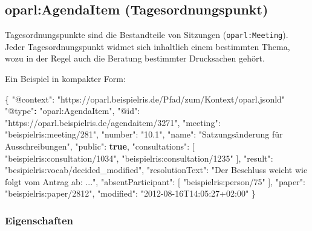 \documentclass[,a4paper]{article}
\newenvironment{Shaded}{}{}
\newcommand{\KeywordTok}[1]{\textcolor[rgb]{0.00,0.44,0.13}{\textbf{{#1}}}}
\newcommand{\DataTypeTok}[1]{\textcolor[rgb]{0.56,0.13,0.00}{{#1}}}
\newcommand{\StringTok}[1]{\textcolor[rgb]{0.25,0.44,0.63}{{#1}}}
\newcommand{\OtherTok}[1]{\textcolor[rgb]{0.00,0.44,0.13}{{#1}}}
\newcommand{\FunctionTok}[1]{\textcolor[rgb]{0.02,0.16,0.49}{{#1}}}
\newcommand{\ErrorTok}[1]{\textcolor[rgb]{1.00,0.00,0.00}{\textbf{{#1}}}}
\begin{document}
\subsection{oparl:AgendaItem
(Tagesordnungspunkt)}\label{oparlux5fagendaitem}

Tagesordnungspunkte sind die Bestandteile von Sitzungen
(\texttt{oparl:Meeting}). Jeder Tagesordnungspunkt widmet sich
inhaltlich einem bestimmten Thema, wozu in der Regel auch die Beratung
bestimmter Drucksachen gehört.

Ein Beispiel in kompakter Form:

\begin{Shaded}
\begin{Highlighting}[]
\FunctionTok{\{}
    \DataTypeTok{"@context"}\FunctionTok{:} \StringTok{"https://oparl.beispielris.de/Pfad/zum/Kontext/oparl.jsonld"}
    \StringTok{"@type"}\ErrorTok{:} \StringTok{"oparl:AgendaItem"}\FunctionTok{,}
    \DataTypeTok{"@id"}\FunctionTok{:} \StringTok{"https://oparl.beispielris.de/agendaitem/3271"}\FunctionTok{,}
    \DataTypeTok{"meeting"}\FunctionTok{:} \StringTok{"beispielris:meeting/281"}\FunctionTok{,}
    \DataTypeTok{"number"}\FunctionTok{:} \StringTok{"10.1"}\FunctionTok{,}
    \DataTypeTok{"name"}\FunctionTok{:} \StringTok{"Satzungsänderung für Ausschreibungen"}\FunctionTok{,}
    \DataTypeTok{"public"}\FunctionTok{:} \KeywordTok{true}\FunctionTok{,}
    \DataTypeTok{"consultations"}\FunctionTok{:} \OtherTok{[}
        \StringTok{"beispielris:consultation/1034"}\OtherTok{,}
        \StringTok{"beispielris:consultation/1235"}
    \OtherTok{]}\FunctionTok{,}
    \DataTypeTok{"result"}\FunctionTok{:} \StringTok{"besipielris:vocab/decided_modified"}\FunctionTok{,}
    \DataTypeTok{"resolutionText"}\FunctionTok{:} \StringTok{"Der Beschluss weicht wie folgt vom Antrag ab: ..."}\FunctionTok{,}
    \DataTypeTok{"absentParticipant"}\FunctionTok{:} \OtherTok{[}
        \StringTok{"beispielris:person/75"}
    \OtherTok{]}\FunctionTok{,}
    \DataTypeTok{"paper"}\FunctionTok{:} \StringTok{"beispielris:paper/2812"}\FunctionTok{,}
    \DataTypeTok{"modified"}\FunctionTok{:} \StringTok{"2012-08-16T14:05:27+02:00"}
\FunctionTok{\}}
\end{Highlighting}
\end{Shaded}

\subsubsection{Eigenschaften}\label{eigenschaften-5}
\end{document}

